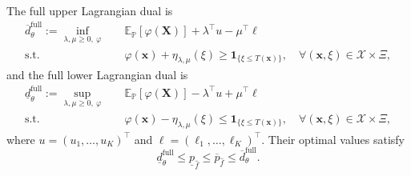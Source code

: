 \begin{lemma}
  \label{lem-weak-duality}
  The full upper Lagrangian dual is
  \begin{equation}
    \begin{aligned}
      \overline d_\theta^{\mathrm{full}}:=\inf_{\lambda,\mu\ge0,\ \varphi}\quad&
      \mathbb E_{\mathbb P}\left[\varphi(\bm X)\right]+\lambda^\top u-\mu^\top\ell\\
      \text{s.t.}\quad&\varphi(\bm x)+\eta_{\lambda,\mu}(\xi)
      \ge\mathbf1_{\{\xi\le T(\bm x)\}},
      \quad\forall(\bm x,\xi)\in\mathcal X\times\Xi,
    \end{aligned}
    \label{eq-upper-measure-dual}
  \end{equation}
  and the full lower Lagrangian dual is
  \begin{equation}
    \begin{aligned}
      \underline d_\theta^{\mathrm{full}}:=\sup_{\lambda,\mu\ge0,\ \varphi}\quad&
      \mathbb E_{\mathbb P}\left[\varphi(\bm X)\right]-\lambda^\top u+\mu^\top\ell\\
      \text{s.t.}\quad&\varphi(\bm x)-\eta_{\lambda,\mu}(\xi)
      \le\mathbf1_{\{\xi\le T(\bm x)\}},
      \quad\forall(\bm x,\xi)\in\mathcal X\times\Xi,
    \end{aligned}
    \label{eq-lower-measure-dual}
  \end{equation}
  where $u=(u_1,\ldots,u_K)^\top$ and $\ell=(\ell_1,\ldots,\ell_K)^\top$. Their optimal values satisfy
  \begin{equation}
    \underline d_\theta^{\mathrm{full}}
    \le\underline p_{\hat f}\le\overline p_{\hat f}
    \le\overline d_\theta^{\mathrm{full}}.
    \label{eq-weak-duality}
  \end{equation}
\end{lemma}
